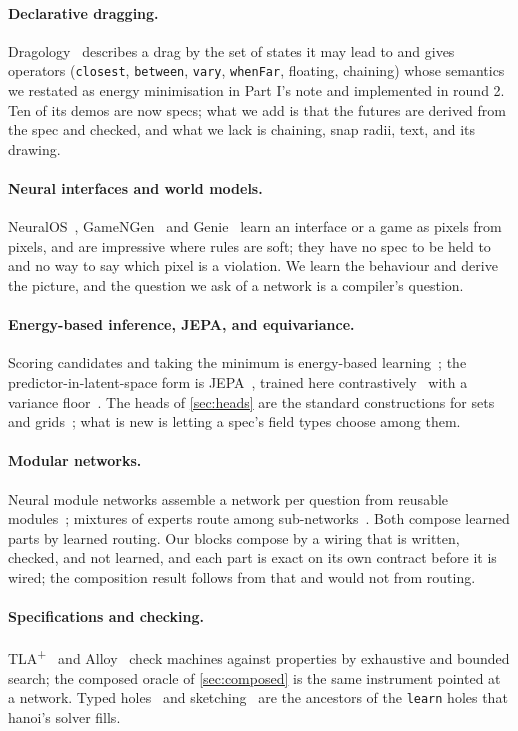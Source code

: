 \paragraph{Declarative dragging.} Dragology~\citep{dragology} describes a drag by the set of states it may lead
to and gives operators (\texttt{closest}, \texttt{between}, \texttt{vary}, \texttt{whenFar}, floating, chaining)
whose semantics we restated as energy minimisation in Part I's note and implemented in round 2. Ten of its demos
are now \method specs; what we add is that the futures are derived from the spec and checked, and what we lack
is chaining, snap radii, text, and its drawing.

\paragraph{Neural interfaces and world models.} NeuralOS~\citep{rivard2026neuralos}, GameNGen~\citep{valevski2024gamengen}
and Genie~\citep{bruce2024genie} learn an interface or a game as pixels from pixels, and are impressive where
rules are soft; they have no spec to be held to and no way to say which pixel is a violation. We learn the
behaviour and derive the picture, and the question we ask of a network is a compiler's question.

\paragraph{Energy-based inference, JEPA, and equivariance.} Scoring candidates and taking the minimum is
energy-based learning~\citep{lecun2006tutorial}; the predictor-in-latent-space form is JEPA~\citep{lecun2022path,assran2023ijepa},
trained here contrastively~\citep{oord2018cpc} with a variance floor~\citep{bardes2022vicreg}. The heads of
\cref{sec:heads} are the standard constructions for sets and grids~\citep{zaheer2017deepsets,lee2019settransformer,cohen2016gcnn};
what is new is letting a spec's field types choose among them.

\paragraph{Modular networks.} Neural module networks assemble a network per question from reusable
modules~\citep{andreas2016nmn}; mixtures of experts route among sub-networks~\citep{shazeer2017moe}. Both compose
learned parts by learned routing. Our blocks compose by a wiring that is written, checked, and not learned, and
each part is exact on its own contract before it is wired; the composition result follows from that and would
not from routing.

\paragraph{Specifications and checking.} TLA\textsuperscript{+}~\citep{lamport2002tla} and Alloy~\citep{jackson2012alloy}
check machines against properties by exhaustive and bounded search; the composed oracle of \cref{sec:composed}
is the same instrument pointed at a network. Typed holes~\citep{omar2019hazel} and sketching~\citep{solar2008sketch}
are the ancestors of the \texttt{learn} holes that hanoi's solver fills.

